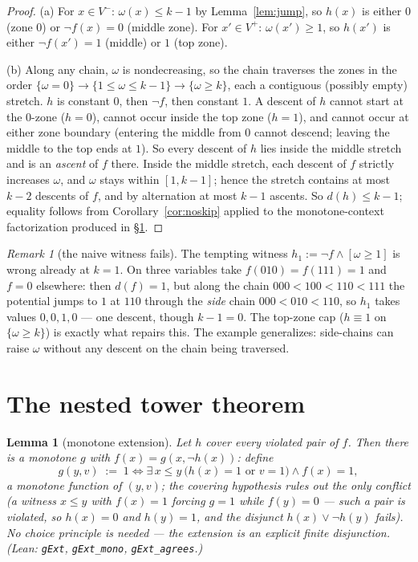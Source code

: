 \documentclass[11pt]{article}
\newtheorem{lemma}[theorem]{Lemma}
\theoremstyle{remark}
\newtheorem{remark}[theorem]{Remark}
\begin{document}
\begin{proof}
(a) For $x\in V^-$: $\omega(x)\le k-1$ by Lemma~\ref{lem:jump}, so $h(x)$ is
either $0$ (zone $0$) or $\neg f(x)=0$ (middle zone). For $x'\in V^+$:
$\omega(x')\ge 1$, so $h(x')$ is either $\neg f(x')=1$ (middle) or $1$ (top
zone).

(b) Along any chain, $\omega$ is nondecreasing, so the chain traverses the
zones in the order $\{\omega=0\}\to\{1\le\omega\le k-1\}\to\{\omega\ge k\}$,
each a contiguous (possibly empty) stretch. $h$ is constant $0$, then
$\neg f$, then constant $1$. A descent of $h$ cannot start at the $0$-zone
($h=0$), cannot occur inside the top zone ($h=1$), and cannot occur at
either zone boundary (entering the middle from $0$ cannot descend; leaving
the middle to the top ends at $1$). So every descent of $h$ lies inside the
middle stretch and is an \emph{ascent} of $f$ there. Inside the middle
stretch, each descent of $f$ strictly increases $\omega$, and $\omega$ stays
within $[1,k-1]$; hence the stretch contains at most $k-2$ descents of $f$,
and by alternation at most $k-1$ ascents. So $d(h)\le k-1$; equality follows
from Corollary~\ref{cor:noskip} applied to the monotone-context
factorization produced in \S\ref{sec:tower}.
\end{proof}

\begin{remark}[the naive witness fails]\label{rem:naive}
The tempting witness $h_1:=\neg f\wedge[\omega\ge 1]$ is wrong already at
$k=1$. On three variables take $f(010)=f(111)=1$ and $f=0$ elsewhere: then
$d(f)=1$, but along the chain $000<100<110<111$ the potential jumps to $1$
at $110$ through the \emph{side} chain $000<010<110$, so $h_1$ takes values
$0,0,1,0$ --- one descent, though $k-1=0$. The top-zone cap ($h\equiv 1$ on
$\{\omega\ge k\}$) is exactly what repairs this. The example generalizes:
side-chains can raise $\omega$ without any descent on the chain being
traversed.
\end{remark}

\section{The nested tower theorem}\label{sec:tower}

\begin{lemma}[monotone extension]\label{lem:ext}
Let $h$ cover every violated pair of $f$. Then there is a monotone $g$ with
$f(x)=g(x,\neg h(x))$: define
\[
g(y,v)\;:=\;1 \iff \exists\,x\le y\ \bigl(h(x)=1\text{ or }v=1\bigr)
\wedge f(x)=1,
\]
a monotone function of $(y,v)$; the covering hypothesis rules out the only
conflict (a witness $x\le y$ with $f(x)=1$ forcing $g=1$ while $f(y)=0$ ---
such a pair is violated, so $h(x)=0$ and $h(y)=1$, and the disjunct
$h(x)\vee\neg h(y)$ fails). No choice principle is needed --- the extension
is an explicit finite disjunction. (Lean: \texttt{gExt}, \texttt{gExt\_mono},
\texttt{gExt\_agrees}.)
\end{lemma}
\end{document}
